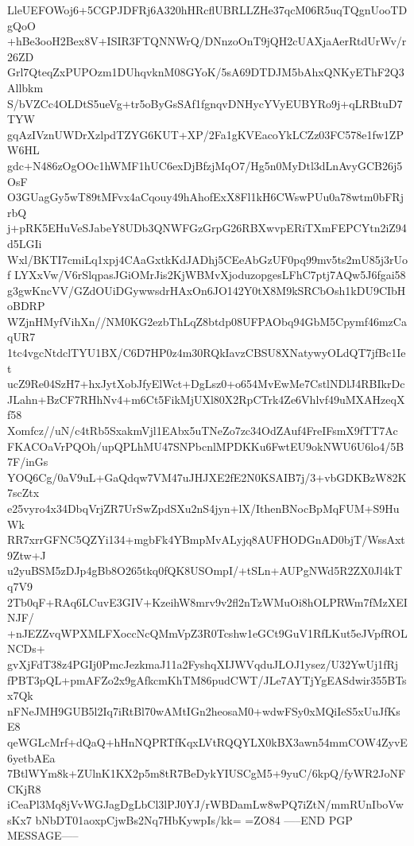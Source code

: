 LleUEFOWoj6+5CGPJDFRj6A320hHRcflUBRLLZHe37qcM06R5uqTQgnUooTDgQoO
+hBe3ooH2Bex8V+ISIR3FTQNNWrQ/DNnzoOnT9jQH2cUAXjaAerRtdUrWv/r26ZD
Grl7QteqZxPUPOzm1DUhqvknM08GYoK/5sA69DTDJM5bAhxQNKyEThF2Q3Allbkm
S/bVZCc4OLDtS5ueVg+tr5oByGsSAf1fgnqvDNHycYVyEUBYRo9j+qLRBtuD7TYW
gqAzIVznUWDrXzlpdTZYG6KUT+XP/2Fa1gKVEacoYkLCZz03FC578e1fw1ZPW6HL
gdc+N486zOgOOc1hWMF1hUC6exDjBfzjMqO7/Hg5n0MyDtl3dLnAvyGCB26j5OsF
O3GUagGy5wT89tMFvx4aCqouy49hAhofExX8Fl1kH6CWswPUu0a78wtm0bFRjrbQ
j+pRK5EHuVeSJabeY8UDb3QNWFGzGrpG26RBXwvpERiTXmFEPCYtn2iZ94d5LGIi
Wxl/BKTI7cmiLq1xpj4CAaGxtkKdJADhj5CEeAbGzUF0pq99mv5ts2mU85j3rUof
LYXxVw/V6rSlqpasJGiOMrJis2KjWBMvXjoduzopgesLFhC7ptj7AQw5J6fgai58
g3gwKncVV/GZdOUiDGywwsdrHAxOn6JO142Y0tX8M9kSRCbOsh1kDU9CIbHoBDRP
WZjnHMyfVihXn//NM0KG2ezbThLqZ8btdp08UFPAObq94GbM5Cpymf46mzCaqUR7
1tc4vgcNtdclTYU1BX/C6D7HP0z4m30RQkIavzCBSU8XNatywyOLdQT7jfBc1Iet
ucZ9Re04SzH7+hxJytXobJfyElWct+DgLsz0+o654MvEwMe7CstlNDlJ4RBIkrDc
JLahn+BzCF7RHhNv4+m6Ct5FikMjUXl80X2RpCTrk4Ze6Vhlvf49uMXAHzeqXf58
Xomfcz//uN/c4tRb5SxakmVjl1EAbx5uTNeZo7zc34OdZAuf4FreIFsmX9fTT7Ac
FKACOaVrPQOh/upQPLhMU47SNPbcnlMPDKKu6FwtEU9okNWU6U6lo4/5B7F/inGs
YOQ6Cg/0aV9uL+GaQdqw7VM47uJHJXE2fE2N0KSAIB7j/3+vbGDKBzW82K7scZtx
e25vyro4x34DbqVrjZR7UrSwZpdSXu2nS4jyn+lX/IthenBNocBpMqFUM+S9HuWk
RR7xrrGFNC5QZYi134+mgbFk4YBmpMvALyjq8AUFHODGnAD0bjT/WssAxt9Ztw+J
u2yuBSM5zDJp4gBb8O265tkq0fQK8USOmpI/+tSLn+AUPgNWd5R2ZX0Jl4kTq7V9
2Tb0qF+RAq6LCuvE3GIV+KzeihW8mrv9v2fl2nTzWMuOi8hOLPRWm7fMzXEINJF/
+nJEZZvqWPXMLFXoccNcQMmVpZ3R0Tcshw1eGCt9GuV1RfLKut5eJVpfROLNCDs+
gvXjFdT38z4PGIj0PmcJezkmaJ11a2FyshqXIJWVqduJLOJ1ysez/U32YwUj1fRj
fPBT3pQL+pmAFZo2x9gAfkcmKhTM86pudCWT/JLe7AYTjYgEASdwir355BTsx7Qk
nFNeJMH9GUB5l2Iq7iRtBl70wAMtIGn2heosaM0+wdwFSy0xMQiIeS5xUuJfKsE8
qeWGLcMrf+dQaQ+hHnNQPRTfKqxLVtRQQYLX0kBX3awn54mmCOW4ZyvE6yetbAEa
7BtlWYm8k+ZUlnK1KX2p5m8tR7BeDykYIUSCgM5+9yuC/6kpQ/fyWR2JoNFCKjR8
iCeaPl3Mq8jVvWGJagDgLbCl3lPJ0YJ/rWBDamLw8wPQ7iZtN/mmRUnIboVwsKx7
bNbDT01aoxpCjwBs2Nq7HbKywpIs/kk=
=ZO84
-----END PGP MESSAGE-----
